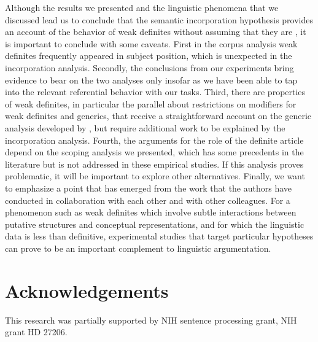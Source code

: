 \documentclass[output=paper,
modfonts
]{langscibook}
\begin{document}
Although the results we presented and the linguistic phenomena that we discussed lead us to conclude that the semantic incorporation hypothesis provides an account of the behavior of weak definites without assuming that they are , it is important to conclude with some caveats. First in the corpus analysis weak definites frequently appeared in subject position, which is unexpected in the incorporation analysis. Secondly, the conclusions from our experiments bring evidence to bear on the two analyses only insofar as we have been able to tap into the relevant referential behavior with our tasks. Third, there are properties of weak definites, in particular the parallel about restrictions on modifiers for weak definites and generics, that receive a straightforward account on the generic analysis developed by \citet{Aguilar-Guevara2014}, but require additional work to be explained by the incorporation analysis.  Fourth, the arguments for the role of the definite article depend on the scoping analysis we presented, which has some precedents in the literature but is not addressed in these empirical studies.  If this analysis proves problematic, it will be important to explore other alternatives. Finally, we want to emphasize a point that has emerged from the work that the authors have conducted in collaboration with each other and with other colleagues. For a phenomenon such as weak definites which involve subtle interactions between putative structures and conceptual representations, and for which the linguistic data is less than definitive, experimental studies that target particular hypotheses can prove to be an important complement to linguistic argumentation.

     
\section*{Acknowledgements}
This research was partially supported by NIH sentence processing grant, NIH grant HD 27206.
\end{document}
